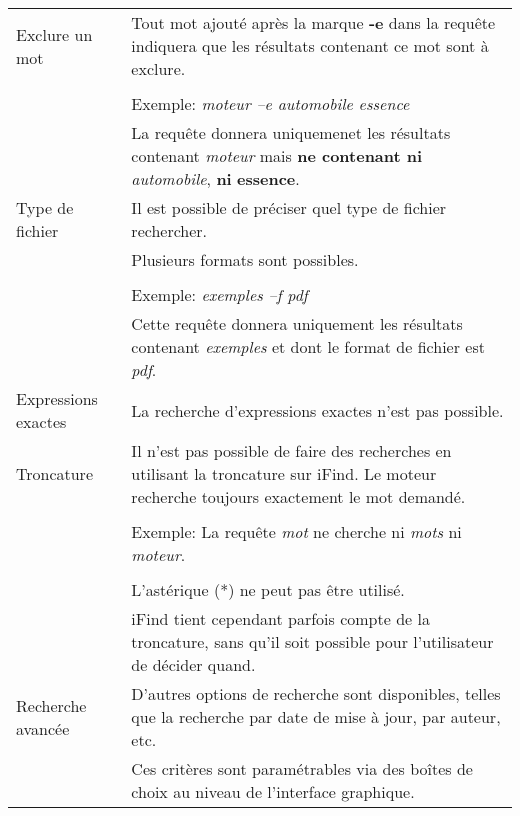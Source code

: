 \begin{longtable}{| p{3.5cm} | p{9cm} |}
\hline
Exclure un mot & Tout mot ajouté après la marque \textbf{-e} dans la requête 
indiquera que les résultats contenant ce mot sont à exclure.\\
& \\
& Exemple: \textit{moteur –e automobile essence}\\
& La requête donnera uniquemenet les résultats contenant \textit{moteur} mais 
\textbf{ne contenant ni} \textit{automobile}, \textbf{ni} \textbf{essence}.\\

\hline
Type de fichier & Il est possible de préciser quel type de fichier rechercher.\\
& Plusieurs formats sont possibles.\\
& \\
& Exemple: \textit{exemples –f pdf}\\
& Cette requête donnera uniquement les résultats contenant \textit{exemples} et
dont le format de fichier est \textit{pdf}.\\

\hline
Expressions exactes & La recherche d'expressions exactes n'est pas possible.\\

\hline
Troncature & Il n'est pas possible de faire des recherches en utilisant la
troncature sur iFind. Le moteur recherche toujours exactement le mot demandé.\\
& \\
& Exemple: La requête \textit{mot} ne cherche ni \textit{mots} ni \textit{moteur}.\\
& \\
& L'astérique (*) ne peut pas être utilisé.\\
& iFind tient cependant parfois compte de la troncature, sans qu'il soit possible
pour l'utilisateur de décider quand.\\

\hline
Recherche avancée & D'autres options de recherche sont disponibles, telles que la 
recherche par date de mise à jour, par auteur, etc.\\
& Ces critères sont paramétrables via des boîtes de choix au niveau de l’interface graphique.\\
\hline

\end{longtable}

